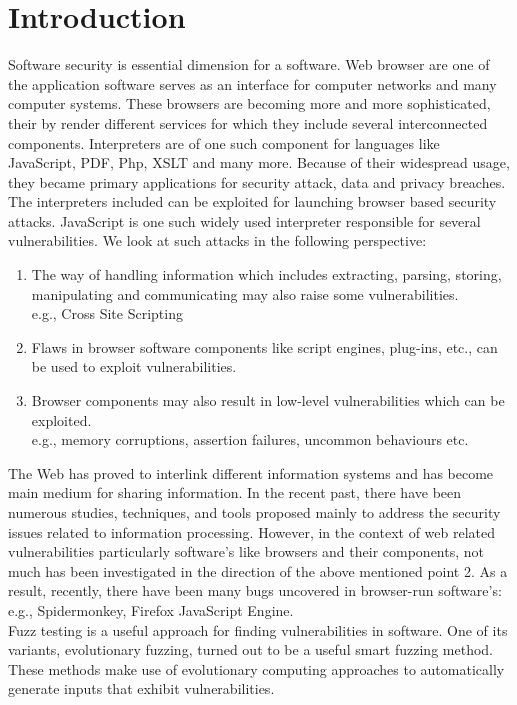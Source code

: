 \documentclass{sig-alternate}
\begin{document}
\section{Introduction}
\indent Software security is essential dimension for a software. Web browser are one of the application software serves as an interface for computer networks and many computer systems. These browsers are becoming more and more sophisticated, their by render different services for which they include several interconnected components. Interpreters are of one such component for languages like JavaScript, PDF, Php, XSLT and many more. Because of their widespread usage, they became primary applications for security attack, data and privacy breaches. The interpreters included can be exploited for launching browser based security attacks. JavaScript is one such widely used interpreter responsible for several vulnerabilities. We look at such attacks in the following perspective:
\begin{enumerate}
\item The way of handling information which includes extracting, parsing, storing, manipulating and communicating may also raise some vulnerabilities.
\\e.g., Cross Site Scripting
\item Flaws in browser software components like script engines, plug-ins, etc., can be used to exploit vulnerabilities. 
\item Browser components may also result in low-level vulnerabilities which can be exploited.
\\e.g., memory corruptions, assertion failures, uncommon behaviours etc.
\end{enumerate}
\indent The Web has proved to interlink different information systems and has become main medium for sharing information. In the recent past, there have been numerous studies, techniques, and tools proposed mainly to address the security issues related to information processing.	However, in the context of web related vulnerabilities particularly software's like browsers and their components, not much has been investigated in the direction of the above mentioned point 2. As a result, recently, there have been many bugs uncovered in browser-run software's: e.g., Spidermonkey, Firefox JavaScript Engine.\\
\indent Fuzz testing is a useful approach for finding vulnerabilities in software. One of its variants, evolutionary fuzzing, turned out to be a useful smart fuzzing method. These methods make use of evolutionary computing approaches to automatically generate inputs that exhibit vulnerabilities.\\
\end{document}
